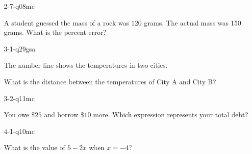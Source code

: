 \begin{practiceQuestion}{2-7-q08}{mc}
\begin{questionText}
A student guessed the mass of a rock was $120$ grams. The actual mass was $150$ grams. What is the percent error?
\end{questionText}
\end{practiceQuestion}

\begin{practiceQuestion}{3-1-q29}{gsa}
\begin{questionText}
The number line shows the temperatures in two cities.

\begin{center}
\end{center}

What is the distance between the temperatures of City A and City B?
\end{questionText}
\end{practiceQuestion}

\begin{practiceQuestion}{3-2-q11}{mc}
\begin{questionText}
You owe $\$25$ and borrow $\$10$ more. Which expression represents your total debt?
\end{questionText}
\end{practiceQuestion}

\begin{practiceQuestion}{4-1-q10}{mc}
\begin{questionText}
What is the value of $5 - 2x$ when $x = -4$?
\end{questionText}
\end{practiceQuestion}

